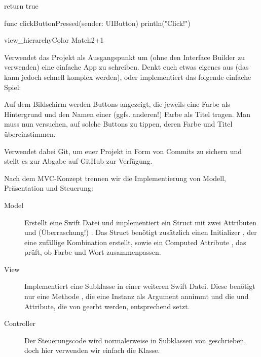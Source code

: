 \documentclass[parskip=half, final]{scrreprt}
\begin{document}
\begin{lecture}
\begin{enumerate}
\begin{swiftcode}
{    return true
}

func clickButtonPressed(sender: UIButton) {
    println("Click!")
}
\end{swiftcode}

\end{enumerate}

\begin{exc}

\begin{excitem}{view_hierarchy}{Color Match}{2+1}

Verwendet das  Projekt als Ausgangspunkt um (ohne den Interface Builder zu verwenden) eine einfache App zu schreiben. Denkt euch etwas eigenes aus (das kann jedoch schnell komplex werden), oder implementiert das folgende einfache Spiel:

Auf dem Bildschirm werden Buttons angezeigt, die jeweils eine Farbe als Hintergrund und den Namen einer (ggfs. anderen!) Farbe als Titel tragen. Man muss nun versuchen, auf solche Buttons zu tippen, deren Farbe und Titel übereinstimmen.

 Verwendet dabei Git, um euer Projekt in Form von Commits zu sichern und stellt es zur Abgabe auf GitHub zur Verfügung.

Nach dem MVC-Konzept trennen wir die Implementierung von Modell, Präsentation und Steuerung:

\begin{description}
	\item[Model] Erstellt eine Swift Datei  und implementiert ein Struct  mit zwei Attributen  und (Überraschung!) . Das Struct benötigt zusätzlich einen Initializer , der eine zufällige Kombination erstellt, sowie ein Computed Attribute , das prüft, ob Farbe und Wort zusammenpassen.
	\item[View] Implementiert eine Subklasse  in einer weiteren Swift Datei. Diese benötigt nur eine Methode , die eine Instanz  als Argument annimmt und die  und  Attribute, die von  geerbt werden, entsprechend setzt.
	\item[Controller] Der Steuerungscode wird normalerweise in Subklassen von  geschrieben, doch hier verwenden wir einfach die  Klasse.
	

\end{description}
\end{excitem}
\end{exc}
\end{lecture}
\end{document}
